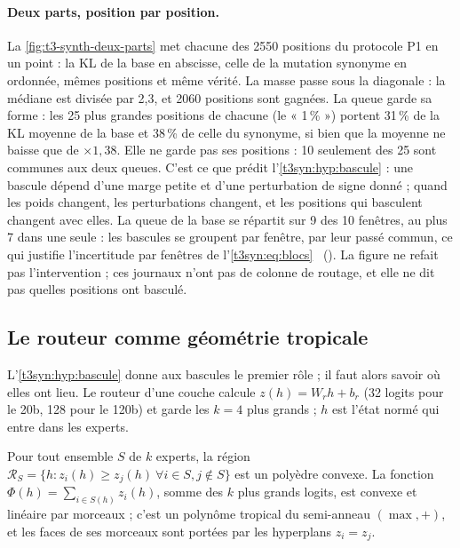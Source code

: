 \paragraph{Deux parts, position par position.} La \cref{fig:t3-synth-deux-parts} met chacune des \num{2550} positions du protocole P1 en un point : la KL de la base en abscisse, celle de la mutation synonyme en ordonnée, mêmes positions et même vérité. La masse passe sous la diagonale : la médiane est divisée par 2,3, et \num{2060} positions sont gagnées. La queue garde sa forme : les 25 plus grandes positions de chacune (le « 1\,\% ») portent 31\,\% de la KL moyenne de la base et 38\,\% de celle du synonyme, si bien que la moyenne ne baisse que de $\times 1{,}38$. Elle ne garde pas ses positions : 10 seulement des 25 sont communes aux deux queues. C'est ce que prédit l'\cref{t3syn:hyp:bascule} : une bascule dépend d'une marge petite et d'une perturbation de signe donné ; quand les poids changent, les perturbations changent, et les positions qui basculent changent avec elles. La queue de la base se répartit sur 9 des 10 fenêtres, au plus 7 dans une seule : les bascules se groupent par fenêtre, par leur passé commun, ce qui justifie l'incertitude par fenêtres de l'\cref{t3syn:eq:blocs} \mes~(). La figure ne refait pas l'intervention ; ces journaux n'ont pas de colonne de routage, et elle ne dit pas quelles positions ont basculé.

\subsection{Le routeur comme géométrie tropicale}\label{t3syn:sec:tropical}

L'\cref{t3syn:hyp:bascule} donne aux bascules le premier rôle ; il faut alors savoir où elles ont lieu. Le routeur d'une couche calcule $z(h) = W_r h + b_r$ (32 logits pour le 20b, 128 pour le 120b) et garde les $k = 4$ plus grands ; $h$ est l'état normé qui entre dans les experts.

\begin{proposition}\label{t3syn:prop:polyedres}
Pour tout ensemble $S$ de $k$ experts, la région $\mathcal{R}_S = \{h : z_i(h) \ge z_j(h)\ \forall i \in S, j \notin S\}$ est un polyèdre convexe. La fonction $\Phi(h) = \sum_{i \in S(h)} z_i(h)$, somme des $k$ plus grands logits, est convexe et linéaire par morceaux ; c'est un polynôme tropical du semi-anneau $(\max, +)$, et les faces de ses morceaux sont portées par les hyperplans $z_i = z_j$.
\end{proposition}


